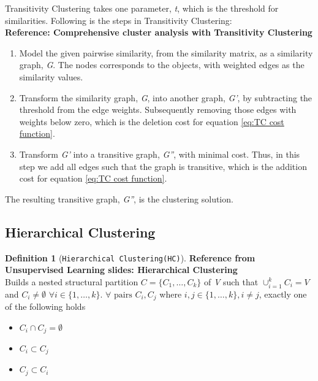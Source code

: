 \documentclass[a4paper,10pt]{article}
\theoremstyle{plain}
\theoremstyle{definition}
\newtheorem{defn}{Definition}
\begin{document}
Transitivity Clustering takes one parameter, \textit{t}, which is the threshold for similarities. Following is the steps in Transitivity Clustering: \\
\textbf{Reference: Comprehensive cluster analysis with Transitivity Clustering}
\begin{enumerate}
	\item Model the given pairwise similarity, from the similarity matrix, as a similarity graph, \textit{G}. The nodes corresponds to the objects, with weighted edges as the similarity values.
	
	\item Transform the similarity graph, \textit{G}, into another graph, \textit{G'}, by subtracting the threshold from the edge weights. Subsequently removing those edges with weights below zero, which is the deletion cost for equation \ref{eq:TC cost function}.
	
	\item Transform \textit{G'} into a transitive graph, \textit{G''}, with minimal cost. Thus, in this step we add all edges such that the graph is transitive, which is the addition cost for equation \ref{eq:TC cost function}.
\end{enumerate}
The resulting transitive graph, \textit{G''}, is the clustering solution.


\subsection{Hierarchical Clustering}

\begin{defn}[\texttt{Hierarchical Clustering(HC)}]\label{def:hc}
	\textbf{Reference from Unsupervised Learning slides: Hierarchical Clustering}\\
	Builds a nested structural partition $C = 	\{ C_1, \dots, C_k\}$ of \textit{V} such that $\cup_{i = 1}^{k} C_i = V$ and $C_i \neq \emptyset$ $\forall i \in \{1, \dots, k\}$. $\forall \text{ pairs } C_i, C_j$ where $i,j \in \{1, \dots, k\}, i \neq j$, exactly one of the following holds
	\begin{itemize}
		\item $C_i \cap C_j = \emptyset$
		\item $C_i \subset C_j$
		\item $C_j \subset C_i$
	\end{itemize}
\end{defn}
\end{document}
